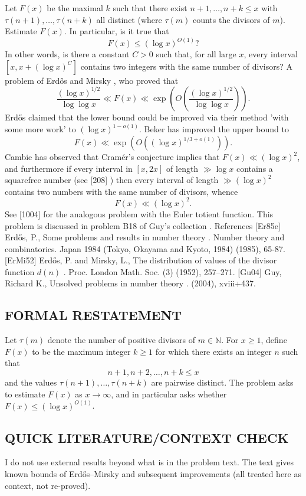 Let $F(x)$ be the maximal $k$ such that there exist $n+1,\ldots,n+k\leq x$ with $\tau(n+1),\ldots,\tau(n+k)$ all distinct (where $\tau(m)$ counts the divisors of $m$). Estimate $F(x)$. In particular, is it true that\[F(x) \leq (\log x)^{O(1)}?\]In other words, is there a constant $C>0$ such that, for all large $x$, every interval $[x,x+(\log x)^C]$ contains two integers with the same number of divisors? A problem of Erd\H{o}s and Mirsky \cite{ErMi52}, who proved that\[\frac{(\log x)^{1/2}}{\log\log x}\ll F(x) \ll \exp\left(O\left(\frac{(\log x)^{1/2}}{\log\log x}\right)\right).\]Erd\H{o}s \cite{Er85e} claimed that the lower bound could be improved via their method 'with some more work' to $(\log x)^{1-o(1)}$. Beker has improved the upper bound to\[F(x) \ll \exp\left(O\left((\log x)^{1/3+o(1)}\right)\right).\]Cambie has observed that Cram\'{e}r's conjecture implies that $F(x) \ll (\log x)^2$, and furthermore if every interval in $[x,2x]$ of length $\gg \log x$ contains a squarefree number (see [208] ) then every interval of length $\gg (\log x)^2$ contains two numbers with the same number of divisors, whence\[F(x) \ll (\log x)^2.\]See [1004] for the analogous problem with the Euler totient function. This problem is discussed in problem B18 of Guy's collection \cite{Gu04}. References [Er85e] Erd\H{o}s, P., Some problems and results in number theory . Number theory and combinatorics. Japan 1984 (Tokyo, Okayama and Kyoto, 1984) (1985), 65-87. [ErMi52] Erd\H{o}s, P. and Mirsky, L., The distribution of values of the divisor function {$d(n)$} . Proc. London Math. Soc. (3) (1952), 257--271. [Gu04] Guy, Richard K., Unsolved problems in number theory . (2004), xviii+437.

\subsection*{FORMAL RESTATEMENT}
Let $\tau(m)$ denote the number of positive divisors of $m\in\mathbb{N}$.
For $x\ge 1$, define $F(x)$ to be the maximum integer $k\ge 1$ for which there exists an integer $n$ such that
\[
 n+1, n+2,\dots,n+k \le x
\]
and the values $\tau(n+1),\dots,\tau(n+k)$ are pairwise distinct.
The problem asks to estimate $F(x)$ as $x\to\infty$, and in particular asks whether $F(x)\le (\log x)^{O(1)}$.

\subsection*{QUICK LITERATURE/CONTEXT CHECK}
I do not use external results beyond what is in the problem text.
The text gives known bounds of Erd\H{o}s--Mirsky and subsequent improvements (all treated here as context, not re-proved).

